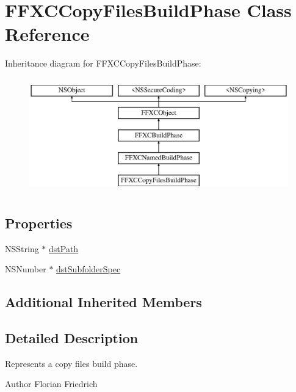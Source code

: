 \hypertarget{interface_f_f_x_c_copy_files_build_phase}{\section{F\-F\-X\-C\-Copy\-Files\-Build\-Phase Class Reference}
\label{interface_f_f_x_c_copy_files_build_phase}
}
Inheritance diagram for F\-F\-X\-C\-Copy\-Files\-Build\-Phase\-:\begin{figure}[H]
\begin{center}
\leavevmode
\includegraphics[height=5.000000cm]{interface_f_f_x_c_copy_files_build_phase}
\end{center}
\end{figure}
\subsection*{Properties}
\begin{DoxyCompactItemize}
\item 
N\-S\-String $\ast$ \hyperlink{interface_f_f_x_c_copy_files_build_phase_a712285934a98e86197a5eb1580478798}{dst\-Path}
\item 
N\-S\-Number $\ast$ \hyperlink{interface_f_f_x_c_copy_files_build_phase_ad50ccf205b7197281d5c6716d7264cb4}{dst\-Subfolder\-Spec}
\end{DoxyCompactItemize}
\subsection*{Additional Inherited Members}


\subsection{Detailed Description}
Represents a copy files build phase. \begin{DoxyAuthor}{Author}
Florian Friedrich 
\end{DoxyAuthor}


